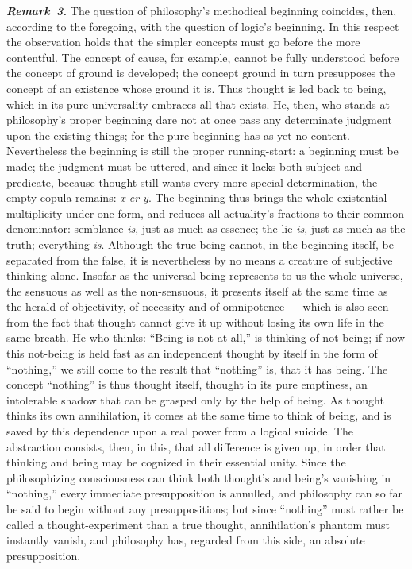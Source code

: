 \documentclass[12pt]{book}
\newcommand{\anm}[1]{\emph{\textbf{Remark~#1.}}}
\begin{document}
\anm{3} The question of philosophy's methodical beginning coincides, then,
according to the foregoing, with the question of logic's beginning. In this
respect the observation holds that the simpler concepts must go before the
more contentful. The concept of cause, for example, cannot be fully
understood before the concept of ground is developed; the concept ground in
turn presupposes the concept of an existence whose ground it is. Thus
thought is led back to being, which in its pure universality embraces all
that exists. He, then, who stands at philosophy's proper beginning dare not
at once pass any determinate judgment upon the existing things; for the pure
beginning has as yet no content. Nevertheless the beginning is still the
proper running-start: a beginning must be made; the judgment must be
uttered, and since it lacks both subject and predicate, because thought
still wants every more special determination, the empty copula remains:
\textit{x er y}. The beginning thus brings the whole existential
multiplicity under one form, and reduces all actuality's fractions to their
common denominator: semblance \emph{is}, just as much as essence; the lie
\emph{is}, just as much as the truth; everything \emph{is}. Although the
true being cannot, in the beginning itself, be separated from the false, it
is nevertheless by no means a creature of subjective thinking alone. Insofar
as the universal being represents to us the whole universe, the sensuous as
well as the non-sensuous, it presents itself at the same time as the herald
of objectivity, of necessity and of omnipotence --- which is also seen from
the fact that thought cannot give it up without losing its own life in the
same breath. He who thinks: ``Being is not at all,'' is thinking of
not-being; if now this not-being is held fast as an independent thought by
itself in the form of ``nothing,'' we still come to the result that
``nothing'' is, that it has being. The concept ``nothing'' is thus thought
itself, thought in its pure emptiness, an intolerable shadow that can be
grasped only by the help of being. As thought thinks its own annihilation,
it comes at the same time to think of being, and is saved by this dependence
upon a real power from a logical suicide. The abstraction consists, then, in
this, that all difference is given up, in order that thinking and being may
be cognized in their essential unity. Since the philosophizing consciousness
can think both thought's and being's vanishing in ``nothing,'' every
immediate presupposition is annulled, and philosophy can so far be said to
begin without any presuppositions; but since ``nothing'' must rather be
called a thought-experiment than a true thought, annihilation's phantom must
instantly vanish, and philosophy has, regarded from this side, an absolute
presupposition.
\end{document}
